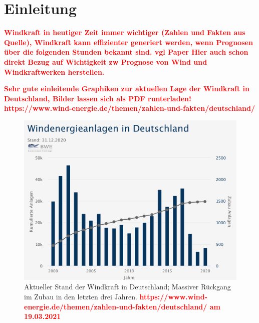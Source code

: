\documentclass[
12pt, %
toc=listofnumbered, %
toc=chapterentrydotfill, %
numbers=noenddot, %
captions=tableheading, %
]{scrreprt}
\newcommand{\highlight}[1]{\textbf{\textcolor{red}{#1}}}
\begin{document}
\tableofcontents
\chapter{Einleitung}

\highlight{Windkraft in heutiger Zeit immer wichtiger (Zahlen und Fakten aus Quelle), 
Windkraft kann effizienter generiert werden, wenn Prognosen über die folgenden Stunden bekannt sind. vgl Paper 
Hier auch schon direkt Bezug auf Wichtigkeit zw Prognose von Wind und Windkraftwerken herstellen.
}

\highlight{Sehr gute einleitende Graphiken zur aktuellen Lage der Windkraft in Deutschland, Bilder lassen sich als PDF runterladen!\\
https://www.wind-energie.de/themen/zahlen-und-fakten/deutschland/}

\begin{figure}[tph]
	\begin{center}
		\includegraphics[width=.8\textwidth]{./images/windanlagen_deutschland.pdf}
		\caption{Aktueller Stand der Windkraft in Deutschland; Massiver Rückgang im Zubau in den letzten drei Jahren. \highlight{https://www.wind-energie.de/themen/zahlen-und-fakten/deutschland/ am 19.03.2021}}
		\label{fig:windkraft_deutschland}
	\end{center}
\end{figure}
\end{document}
